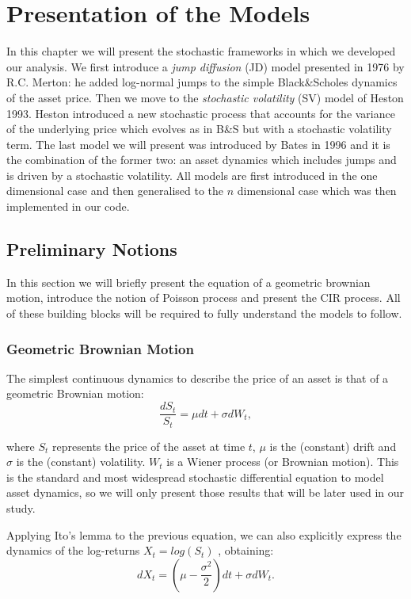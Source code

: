 \chapter{Presentation of the Models}
\label{chpr:models}
In this chapter we will present the stochastic frameworks in which we developed our analysis. We first introduce a \textit{jump diffusion} (JD) model presented in 1976 by R.C. Merton: he added log-normal jumps to the simple Black\&Scholes dynamics of the asset price. Then we move to the \textit{stochastic volatility} (SV) model of Heston 1993. Heston introduced a new stochastic process that accounts for the variance of the underlying price which evolves as in B\&S  but with a stochastic volatility term.
The last model we will present was introduced by Bates in 1996 and it is the combination of the former two: an asset dynamics which includes jumps and is driven by a stochastic volatility.
All models are first introduced in the one dimensional case and then generalised to the $n$ dimensional case which was then implemented in our code.

\bigskip

\section{Preliminary Notions}
\label{sec:notions}
In this section we will briefly present the equation of a geometric brownian motion, introduce the notion of Poisson process and present the 
CIR process. All of these building blocks will be required to fully understand the models to follow.


\subsection{Geometric Brownian Motion}
The simplest continuous dynamics to describe the price of an asset is that of a geometric Brownian motion:
\begin{equation}
	\label{eq:GBM}
	\frac{dS_t}{S_t} = \mu dt + \sigma dW_t,
\end{equation}

where $S_t$ represents the price of the asset at time $t$, $\mu$ is the (constant) drift and $\sigma$ is the (constant) volatility. $W_t$ is a Wiener process (or Brownian motion).
This is the standard and most widespread stochastic differential equation to model asset dynamics, so we will only present those results that will be later used in our study.


Applying Ito's lemma to the previous equation, we can also explicitly express the dynamics of the log-returns $X_t = log(S_t)$ , obtaining:
\begin{equation}
	dX_t = (\mu - 	\frac{\sigma^2}{2}) dt + \sigma dW_t .
\end{equation}


